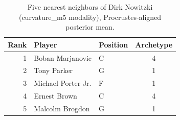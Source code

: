 \begin{table}[htbp]
  \centering\small
  \begin{tabular}{rllc}
    \toprule
    Rank & Player & Position & Archetype \\
    \midrule
    1 & Boban Marjanovic & C & 4 \\
    2 & Tony Parker & G & 1 \\
    3 & Michael Porter Jr. & F & 1 \\
    4 & Ernest Brown & C & 4 \\
    5 & Malcolm Brogdon & G & 1 \\
    \bottomrule
  \end{tabular}
  \caption{Five nearest neighbors of Dirk Nowitzki (curvature_m5 modality), Procrustes-aligned posterior mean.}
  \label{tab:Dirk_Nowitzki_neighbors_curvature_m5}
\end{table}

